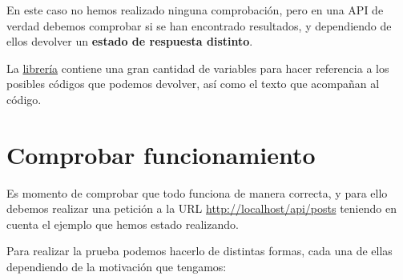\begin{itemize}
En este caso no hemos realizado ninguna comprobación, pero en una API de verdad debemos comprobar si se han encontrado resultados, y dependiendo de ellos devolver un \textbf{estado de respuesta distinto}.

La \href{https://github.com/symfony/symfony/blob/6.3/src/Symfony/Component/HttpFoundation/Response.php}{librería} contiene una gran cantidad de variables para hacer referencia a los posibles códigos que podemos devolver, así como el texto que acompañan al código.

\end{itemize}


\chapter{Comprobar funcionamiento}
Es momento de comprobar que todo funciona de manera correcta, y para ello debemos realizar una petición a la URL \href{http://localhost/api/posts}{http://localhost/api/posts} teniendo en cuenta el ejemplo que hemos estado realizando.

Para realizar la prueba podemos hacerlo de distintas formas, cada una de ellas dependiendo de la motivación que tengamos:

